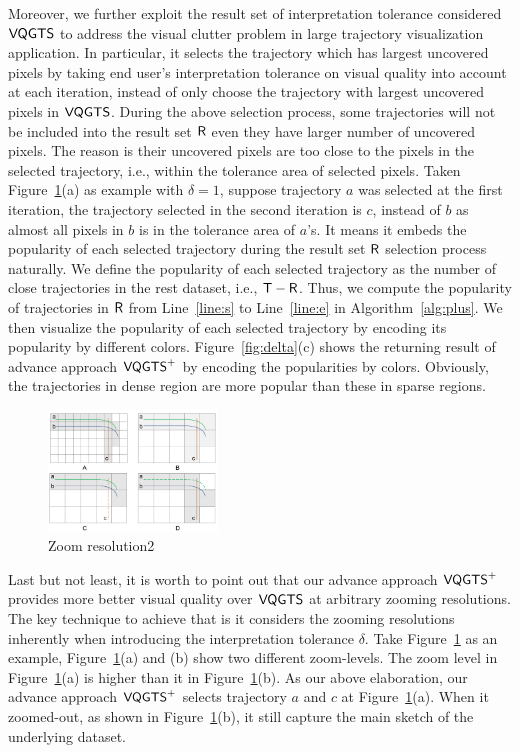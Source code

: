 Moreover, we further exploit the result set of interpretation tolerance considered $\mathsf{VQGTS}$ to address the visual clutter problem in large trajectory visualization application.
In particular, it selects the trajectory which has largest uncovered pixels by taking end user's interpretation tolerance on visual quality into account at each iteration,
instead of only choose the trajectory with largest uncovered pixels in $\mathsf{VQGTS}$.
During the above selection process, some trajectories will not be included into the result set $\mathsf{R}$ even they have larger number of uncovered pixels.
The reason is their uncovered pixels are too close to the pixels in the selected trajectory, i.e., within the tolerance area of selected pixels.
Taken Figure~\ref{fig:zoom}(a) as example with $\delta=1$, suppose trajectory $a$ was selected at the first iteration,
the trajectory selected in the second iteration is $c$, instead of $b$ as almost all pixels in $b$ is in the tolerance area of $a$'s.
It means it embeds the popularity of each selected trajectory during the result set $\mathsf{R}$ selection process naturally.
We define the popularity of each selected trajectory as the number of close trajectories in the rest dataset, i.e., $\mathsf{T}-\mathsf{R}$.
Thus, we compute the popularity of trajectories in $\mathsf{R}$ from Line~\ref{line:s} to Line~\ref{line:e} in Algorithm~\ref{alg:plus}.
We then visualize the popularity of each selected trajectory by encoding its popularity by different colors.
Figure~\ref{fig:delta}(c) shows the returning result of advance approach $\mathsf{VQGTS}^{+}$ by encoding the popularities by colors.
Obviously, the trajectories in dense region are more popular than these in sparse regions.

\begin{figure}[t]
	\centering
	\includegraphics[width=0.4\textwidth]{pictures/problemsolveing/one_to_many.pdf}
	\caption{Zoom resolution2}
	\label{fig:zoom}
\end{figure}

Last but not least, it is worth to point out that our advance approach $\mathsf{VQGTS}^{+}$ provides more better visual quality over $\mathsf{VQGTS}$ at arbitrary zooming resolutions.
The key technique to achieve that is it considers the zooming resolutions inherently when introducing the interpretation tolerance $\delta$.
Take Figure~\ref{fig:zoom} as an example, Figure~\ref{fig:zoom}(a) and (b) show two different zoom-levels.
The zoom level in Figure~\ref{fig:zoom}(a) is higher than it in Figure~\ref{fig:zoom}(b).
As our above elaboration, our advance approach $\mathsf{VQGTS}^{+}$ selects trajectory $a$ and $c$ at Figure~\ref{fig:zoom}(a).
When it zoomed-out, as shown in Figure~\ref{fig:zoom}(b), it still capture the main sketch of the underlying dataset.





